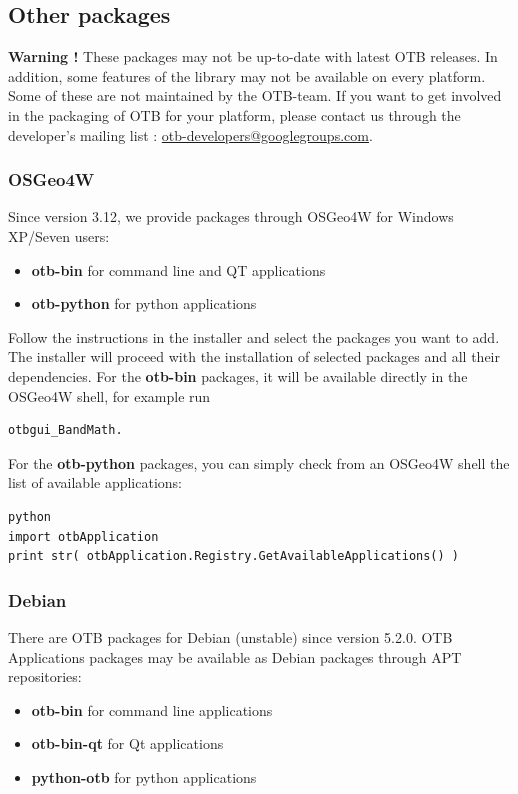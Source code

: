 \subsection{Other packages}

\textbf{Warning !} These packages may not be up-to-date with latest OTB releases.
In addition, some features of the library may not be available on every platform.
Some of these are not maintained by the OTB-team. If you want to get involved in
the packaging of OTB for your platform, please contact us through the developer's
mailing list :
\href{mailto:otb-developers@googlegroups.com}{otb-developers@googlegroups.com}.

\subsubsection{OSGeo4W}

Since version 3.12, we provide \app packages through OSGeo4W for Windows XP/Seven users:
\begin{itemize}
\item \textbf{otb-bin} for command line and QT applications
\item \textbf{otb-python} for python applications
\end{itemize}
Follow the instructions in the installer and select the packages you want to add. The installer will proceed with the installation of selected packages and all their dependencies.
For the \textbf{otb-bin} packages, it will be available directly in the OSGeo4W shell, for example run
\begin{verbatim}
otbgui_BandMath.
\end{verbatim}
For the \textbf{otb-python} packages, you can simply check from an OSGeo4W shell the list of available applications:
\begin{verbatim}
python
import otbApplication
print str( otbApplication.Registry.GetAvailableApplications() )
\end{verbatim}

\subsubsection{Debian}

There are OTB packages for Debian (unstable) since version 5.2.0.
OTB Applications packages may be available as
Debian packages through APT repositories:
\begin{itemize}
\item \textbf{otb-bin} for command line applications
\item \textbf{otb-bin-qt} for Qt applications
\item \textbf{python-otb} for python applications
\end{itemize}


